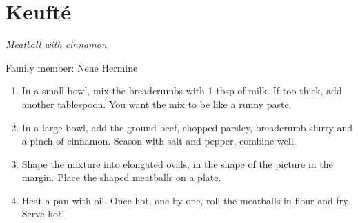 \chapter{Keufté}
\label{ch:Keufte}


\textit{Meatball with cinnamon}

Family member: Nene Hermine

\begin{enumerate}
    \item In a small bowl, mix the breadcrumbs with 1 tbsp of milk. If too thick, add another tablespoon. You want the mix to be like a runny paste.
    \item In a large bowl, add the ground beef, chopped parsley, breadcrumb slurry and a pinch of cinnamon. Season with salt and pepper, combine well.
    \item Shape the mixture into elongated ovals, in the shape of the picture in the margin. Place the shaped meatballs on a plate.
    \item Heat a pan with oil. Once hot, one by one, roll the meatballs in flour and fry. Serve hot!
\end{enumerate}
